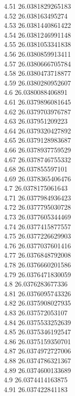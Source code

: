 {4.51	26.0381829265183\\
4.52	26.038163495274\\
4.53	26.0381440861422\\
4.54	26.0381246991148\\
4.55	26.0381053341838\\
4.56	26.0380859913411\\
4.57	26.0380666705784\\
4.58	26.0380473718877\\
4.59	26.0380280952607\\
4.6	26.0380088406891\\
4.61	26.0379896081645\\
4.62	26.0379703976787\\
4.63	26.037951209223\\
4.64	26.0379320427892\\
4.65	26.0379128983687\\
4.66	26.0378937759529\\
4.67	26.0378746755332\\
4.68	26.037855597101\\
4.69	26.0378365406476\\
4.7	26.0378175061643\\
4.71	26.0377984936423\\
4.72	26.0377795030728\\
4.73	26.0377605344469\\
4.74	26.0377415877557\\
4.75	26.0377226629903\\
4.76	26.0377037601416\\
4.77	26.0376848792008\\
4.78	26.0376660201586\\
4.79	26.0376471830059\\
4.8	26.0376283677336\\
4.81	26.0376095743326\\
4.82	26.0375908027935\\
4.83	26.037572053107\\
4.84	26.0375533252639\\
4.85	26.0375346192547\\
4.86	26.0375159350701\\
4.87	26.0374972727006\\
4.88	26.0374786321367\\
4.89	26.0374600133689\\
4.9	26.0374414163875\\
4.91	26.037422841183\\
}
